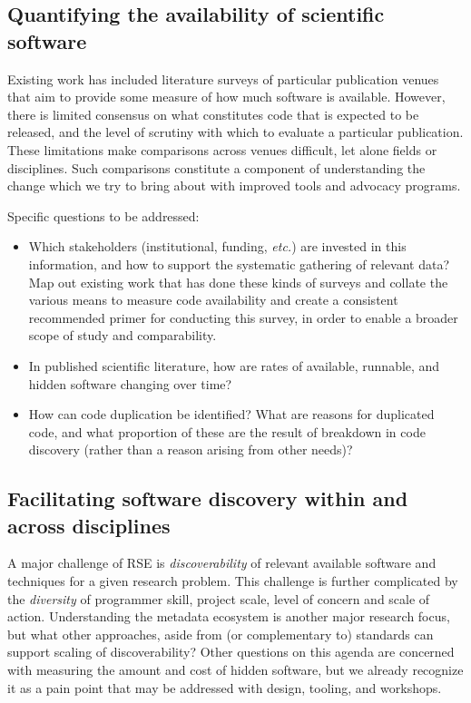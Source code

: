 \documentclass[a4paper,UKenglish]{dagman}
\newcommand{\etc}{\emph{etc.}\xspace}
\begin{document}

\subsection{Quantifying the availability of scientific software}

Existing work has included literature surveys of particular publication venues   that aim to provide some measure of how much software is available. However, there is limited consensus on what constitutes code that is expected to be released, and the level of scrutiny with which to evaluate a particular publication. These limitations make comparisons across venues difficult, let alone fields or disciplines. Such comparisons constitute a component of understanding the change which we try to bring about with improved tools and advocacy programs. 

Specific questions to be addressed:
\begin{itemize}
\item Which stakeholders (institutional, funding, \etc) are invested in this information, and how to support the systematic gathering of relevant data? Map out existing work that has done these kinds of surveys and collate the various means to measure code availability and create a consistent recommended primer for conducting this survey, in order to enable a broader scope of study and comparability.
\item In published scientific literature, how are rates of available, runnable, and hidden software changing over time?
\item How can code duplication be identified? What are reasons for duplicated code, and what proportion of these are the result of breakdown in code discovery (rather than a reason arising from other needs)?
\end{itemize}

\subsection{Facilitating software discovery within and across disciplines}

A major challenge of RSE is \emph{discoverability} of relevant available software and techniques for a given research problem. This challenge is further complicated by the \emph{diversity} of programmer skill, project scale, level of concern and scale of action. Understanding the metadata ecosystem is another major research focus, but what other approaches, aside from (or complementary to) standards can support scaling of discoverability? Other questions on this agenda are concerned with measuring the amount and cost of hidden software, but we already recognize it as a pain point that may be addressed with design, tooling, and workshops.
\end{document}
